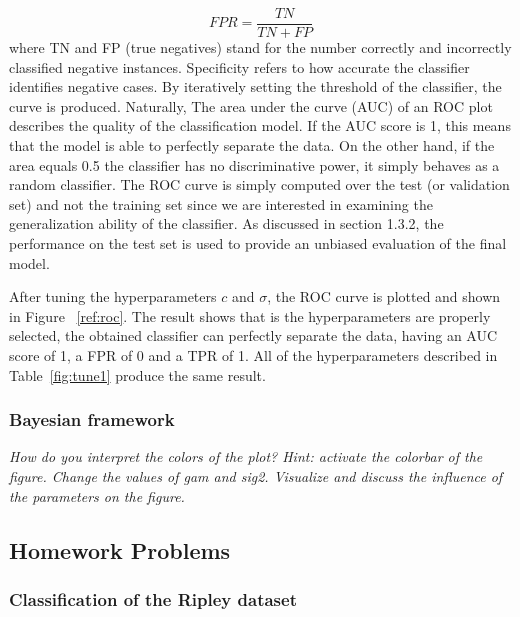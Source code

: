 \documentclass{article}
\begin{document}
\begin{equation}
FPR = \frac{TN}{TN+FP}
\end{equation}
where TN and FP (true negatives) stand for the number correctly and incorrectly classified negative instances. Specificity refers to how accurate the classifier identifies negative cases. By iteratively setting the threshold of the classifier, the curve is produced. Naturally, The area under the curve (AUC) of an ROC plot describes the quality of the classification model. If the AUC score is 1, this means that the model is able to perfectly separate the data. On the other hand, if the area equals 0.5 the classifier has no discriminative power, it simply behaves as a random classifier. The ROC curve is simply computed over the test (or validation set) and not the training set since we are interested in examining the generalization ability of the classifier. As discussed in section 1.3.2, the performance on the test set is used to provide an unbiased evaluation of the final model. 

After tuning the hyperparameters $c$ and $\sigma$, the ROC curve is plotted and shown in Figure ~\ref{ref:roc}. The result shows that is the hyperparameters are properly selected, the obtained classifier can perfectly separate the data, having an AUC score of 1, a FPR of 0 and a TPR of 1. All of the hyperparameters described in Table~\ref{fig:tune1} produce the same result.





\subsubsection{Bayesian framework }
\textit{How do you interpret the colors of the plot? Hint: activate the colorbar of the figure. Change the values of gam and sig2. Visualize and discuss the influence of the parameters on the figure.}



\subsection{Homework Problems}
\subsubsection{Classification of the Ripley dataset}
\end{document}
